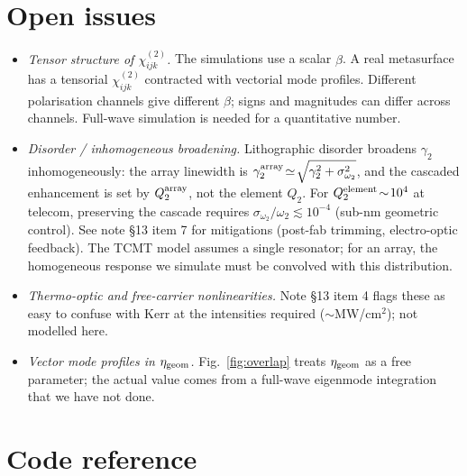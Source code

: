 \documentclass[11pt,a4paper]{article}
\newcommand{\chitwo}{\chi^{(2)}}
\newcommand{\geom}{{\rm geom}}
\begin{document}
\section{Open issues}
\label{sec:open}

\begin{itemize}
\item \emph{Tensor structure of $\chitwo_{ijk}$.} The simulations use
  a scalar $\beta$. A real metasurface has a tensorial $\chitwo_{ijk}$
  contracted with vectorial mode profiles. Different polarisation
  channels give different $\beta$; signs and magnitudes can differ
  across channels. Full-wave simulation is needed for a quantitative
  number.
\item \emph{Disorder / inhomogeneous broadening.} Lithographic disorder
  broadens $\gamma_2$ inhomogeneously: the array linewidth is
  $\gamma_2^{\rm array}\!\simeq\!\sqrt{\gamma_2^{2}+\sigma_{\omega_2}^{2}}$,
  and the cascaded enhancement is set by $Q_2^{\rm array}$, not the
  element $Q_2$. For $Q_2^{\rm element}\!\sim\!10^{4}$ at telecom,
  preserving the cascade requires $\sigma_{\omega_2}/\omega_2\!\lesssim\!10^{-4}$
  (sub-nm geometric control). See note \S13 item 7 for mitigations
  (post-fab trimming, electro-optic feedback). The TCMT model assumes
  a single resonator; for an array, the homogeneous response we
  simulate must be convolved with this distribution.
\item \emph{Thermo-optic and free-carrier nonlinearities.} Note \S13
  item 4 flags these as easy to confuse with Kerr at the intensities
  required ($\sim$MW/cm$^{2}$); not modelled here.
\item \emph{Vector mode profiles in $\eta_\geom$.}
  Fig.~\ref{fig:overlap} treats $\eta_\geom$ as a free parameter; the
  actual value comes from a full-wave eigenmode integration that we
  have not done.
\end{itemize}

\section{Code reference}
\label{sec:code}
\end{document}
